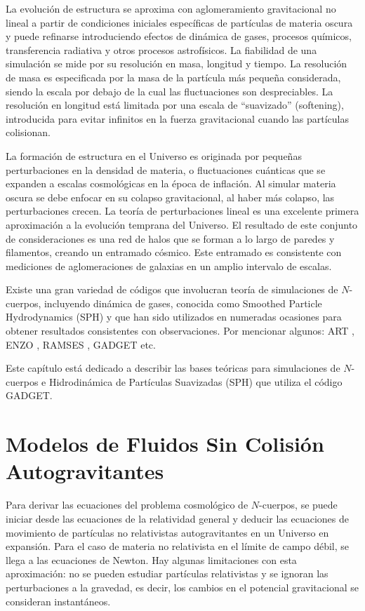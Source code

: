 \documentclass[a4paper,openright,12pt]{book}
\begin{document}
La evolución de estructura se aproxima con aglomeramiento gravitacional  no lineal a partir de condiciones iniciales específicas de partículas de materia oscura y puede refinarse introduciendo efectos de dinámica de gases, procesos químicos, transferencia radiativa y otros procesos astrofísicos. La fiabilidad de una simulación se mide por su resolución en masa, longitud y tiempo. La resolución de masa es especificada por la masa de la partícula más pequeña considerada, siendo la escala por debajo de la cual las fluctuaciones son despreciables. La resolución en longitud está limitada por una escala de ``suavizado'' (softening), introducida para evitar infinitos en la fuerza gravitacional cuando las partículas colisionan.

La formación de estructura en el Universo es originada por pequeñas perturbaciones en la densidad de materia, o fluctuaciones cuánticas que se expanden a escalas cosmológicas en la época de inflación. Al simular materia oscura se debe enfocar en su colapso gravitacional, al haber más colapso, las perturbaciones crecen. La teoría de perturbaciones lineal es una excelente primera aproximación a la evolución temprana del Universo. El resultado de este conjunto de consideraciones es una red de halos que se forman a lo largo de paredes y filamentos, creando un entramado cósmico. Este entramado es consistente con mediciones de aglomeraciones de galaxias en un amplio intervalo de escalas.

Existe una gran variedad de códigos que involucran teoría de simulaciones de $N$-cuerpos, incluyendo dinámica de gases, conocida como Smoothed Particle Hydrodynamics (SPH) y que han sido utilizados en numeradas ocasiones para obtener resultados consistentes con observaciones. Por mencionar algunos: ART \cite{2.1.1}, ENZO \cite{2.1.2}, RAMSES \cite{2.1.3}, GADGET \cite{b4} etc.

Este capítulo está dedicado a describir las bases teóricas para simulaciones de $N$-cuerpos e Hidrodinámica de Partículas Suavizadas (SPH) que utiliza el código GADGET.

\section{Modelos de Fluidos Sin Colisión Autogravitantes}
Para derivar las ecuaciones del problema cosmológico de $N$-cuerpos, se puede iniciar desde las ecuaciones de la relatividad general y deducir las ecuaciones de movimiento de partículas no relativistas autogravitantes en un Universo en expansión. Para el caso de materia no relativista en el límite de campo débil, se llega a las ecuaciones de Newton. Hay algunas limitaciones con esta aproximación: no se pueden estudiar partículas relativistas y se ignoran las perturbaciones a la gravedad, es decir, los cambios en el potencial gravitacional se consideran instantáneos.
\end{document}
